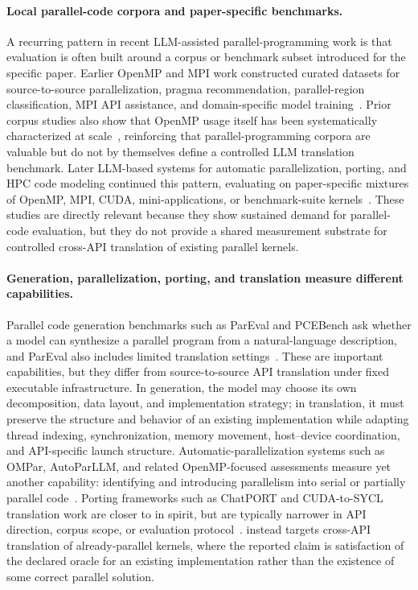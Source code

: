 \paragraph{Local parallel-code corpora and paper-specific benchmarks.}
A recurring pattern in recent LLM-assisted parallel-programming work is that evaluation is often built around a corpus or benchmark subset introduced for the specific paper. Earlier OpenMP and MPI work constructed curated datasets for source-to-source parallelization, pragma recommendation, parallel-region classification, MPI API assistance, and domain-specific model training~\cite{LearningToParallelize2023,MPIRICAL2023,OMPify2023,OMPGPT2024,MPIrigen2024,MonoCoder2024,PragFormer2025,CuratedOpenMPDataset2026}. Prior corpus studies also show that OpenMP usage itself has been systematically characterized at scale~\cite{HPCorpus2023}, reinforcing that parallel-programming corpora are valuable but do not by themselves define a controlled LLM translation benchmark. Later LLM-based systems for automatic parallelization, porting, and HPC code modeling continued this pattern, evaluating on paper-specific mixtures of OpenMP, MPI, CUDA, mini-applications, or benchmark-suite kernels~\cite{OMPar2024,AutoParLLM2025,OpenMPAssessment2024,HPCCoder2024,HPCCoderV2,LargeLLMEvalHPC2024,ChatMPI2026,VibeCodeHPC2026}. These studies are directly relevant because they show sustained demand for parallel-code evaluation, but they do not provide a shared measurement substrate for controlled cross-API translation of existing parallel kernels.

\paragraph{Generation, parallelization, porting, and translation measure different capabilities.}
Parallel code generation benchmarks such as ParEval and PCEBench ask whether a model can synthesize a parallel program from a natural-language description, and ParEval also includes limited translation settings~\cite{ParEval2024,PCEBench2025}. These are important capabilities, but they differ from source-to-source API translation under fixed executable infrastructure. In generation, the model may choose its own decomposition, data layout, and implementation strategy; in translation, it must preserve the structure and behavior of an existing implementation while adapting thread indexing, synchronization, memory movement, host--device coordination, and API-specific launch structure. Automatic-parallelization systems such as OMPar, AutoParLLM, and related OpenMP-focused assessments measure yet another capability: identifying and introducing parallelism into serial or partially parallel code~\cite{OMPar2024,AutoParLLM2025,OpenMPAssessment2024}. Porting frameworks such as ChatPORT and CUDA-to-SYCL translation work are closer to \parbench{} in spirit, but are typically narrower in API direction, corpus scope, or evaluation protocol~\cite{ChatPORT2025,ChatPORTSYCL2025}. \parbench{} instead targets cross-API translation of already-parallel kernels, where the reported claim is satisfaction of the declared oracle for an existing implementation rather than the existence of some correct parallel solution.

